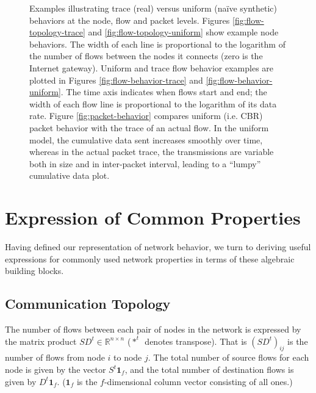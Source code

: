 \documentclass[twocolumn,final]{svjour3}
\newcommand{\R}{\mathbb{R}}
\newcommand{\ones}[1]{\mathbf{1}_{#1}}
\begin{document}
\begin{figure}[tb]
\begin{center}
\caption{Examples illustrating trace (real) versus uniform (na\"ive synthetic) behaviors at the node, flow and packet levels. Figures \ref{fig:flow-topology-trace} and \ref{fig:flow-topology-uniform} show example node behaviors. The width of each line is proportional to the logarithm of the number of flows between the nodes it connects (zero is the Internet gateway). Uniform and trace flow behavior examples are plotted in Figures \ref{fig:flow-behavior-trace} and \ref{fig:flow-behavior-uniform}. The time axis indicates when flows start and end; the width of each flow line is proportional to the logarithm of its data rate. Figure \ref{fig:packet-behavior} compares uniform (i.e. {\footnotesize{CBR}}) packet behavior with the trace of an actual flow. In the uniform model, the cumulative data sent increases smoothly over time, whereas in the actual packet trace, the transmissions are variable both in size and in inter-packet interval, leading to a ``lumpy'' cumulative data plot.}
\label{fig:trace-vs-uniform}
\end{center}
\vspace{-1.25em}
\end{figure}

\section{Expression of Common Properties}
\label{sec:common-properties}

Having defined our representation of network behavior, we turn to deriving useful expressions for commonly used network properties in terms of these algebraic building blocks.

\subsection{Communication Topology}
\label{sec:communication-topology}

The number of flows between each pair of nodes in the network is expressed by the matrix product $SD^t\in\R^{n \times n}$ ($*^t$~denotes transpose). That is $(SD^t)_{ij}$ is the number of flows from node $i$ to node $j$. The total number of source flows for each node is given by the vector $S^t\ones{f}$, and the total number of destination flows is given by $D^t\ones{f}$. ($\ones{f}$ is the $f$-dimensional column vector consisting of all ones.)
\end{document}
